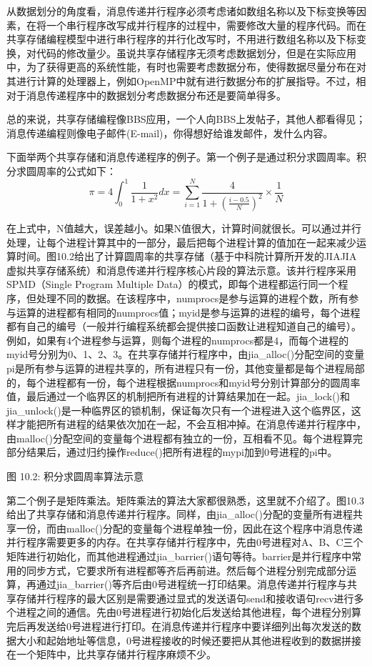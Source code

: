 \documentclass[]{ctexbook}
\begin{document}
从数据划分的角度看，消息传递并行程序必须考虑诸如数组名称以及下标变换等因素，在将一个串行程序改写成并行程序的过程中，需要修改大量的程序代码。而在共享存储编程模型中进行串行程序的并行化改写时，不用进行数组名称以及下标变换，对代码的修改量少。虽说共享存储程序无须考虑数据划分，但是在实际应用中，为了获得更高的系统性能，有时也需要考虑数据分布，使得数据尽量分布在对其进行计算的处理器上，例如OpenMP中就有进行数据分布的扩展指导。不过，相对于消息传递程序中的数据划分考虑数据分布还是要简单得多。

总的来说，共享存储编程像BBS应用，一个人向BBS上发帖子，其他人都看得见；消息传递编程则像电子邮件(E-mail)，你得想好给谁发邮件，发什么内容。

下面举两个共享存储和消息传递程序的例子。第一个例子是通过积分求圆周率。积分求圆周率的公式如下：
\[
\pi = 4\int_{0}^{1}{\frac{1}{1+x^2}}dx = \sum^{N}_{i=1}{\frac{4}{1+(\frac{i-0.5}{N})^2}\times{\frac{1}{N}}}
\]

在上式中，N值越大，误差越小。如果N值很大，计算时间就很长。可以通过并行处理，让每个进程计算其中的一部分，最后把每个进程计算的值加在一起来减少运算时间。图10.2给出了计算圆周率的共享存储（基于中科院计算所开发的JIAJIA虚拟共享存储系统）和消息传递并行程序核心片段的算法示意。该并行程序采用SPMD（Single Program Multiple Data）的模式，即每个进程都运行同一个程序，但处理不同的数据。在该程序中，numprocs是参与运算的进程个数，所有参与运算的进程都有相同的numprocs值；myid是参与运算的进程的编号，每个进程都有自己的编号（一般并行编程系统都会提供接口函数让进程知道自己的编号）。例如，如果有4个进程参与运算，则每个进程的numprocs都是4，而每个进程的myid号分别为0、1、2、3。在共享存储并行程序中，由jia\_alloc()分配空间的变量pi是所有参与运算的进程共享的，所有进程只有一份，其他变量都是每个进程局部的，每个进程都有一份，每个进程根据numprocs和myid号分别计算部分的圆周率值，最后通过一个临界区的机制把所有进程的计算结果加在一起。jia\_lock()和jia\_unlock()是一种临界区的锁机制，保证每次只有一个进程进入这个临界区，这样才能把所有进程的结果依次加在一起，不会互相冲掉。在消息传递并行程序中，由malloc()分配空间的变量每个进程都有独立的一份，互相看不见。每个进程算完部分结果后，通过归约操作reduce()把所有进程的mypi加到0号进程的pi中。

图 10.2: 积分求圆周率算法示意

第二个例子是矩阵乘法。矩阵乘法的算法大家都很熟悉，这里就不介绍了。图10.3给出了共享存储和消息传递并行程序。同样，由jia\_alloc()分配的变量所有进程共享一份，而由malloc()分配的变量每个进程单独一份，因此在这个程序中消息传递并行程序需要更多的内存。在共享存储并行程序中，先由0号进程对A、B、C三个矩阵进行初始化，而其他进程通过jia\_barrier()语句等待。barrier是并行程序中常用的同步方式，它要求所有进程都等齐后再前进。然后每个进程分别完成部分运算，再通过jia\_barrier()等齐后由0号进程统一打印结果。消息传递并行程序与共享存储并行程序的最大区别是需要通过显式的发送语句send和接收语句recv进行多个进程之间的通信。先由0号进程进行初始化后发送给其他进程，每个进程分别算完后再发送给0号进程进行打印。在消息传递并行程序中要详细列出每次发送的数据大小和起始地址等信息，0号进程接收的时候还要把从其他进程收到的数据拼接在一个矩阵中，比共享存储并行程序麻烦不少。
\end{document}
